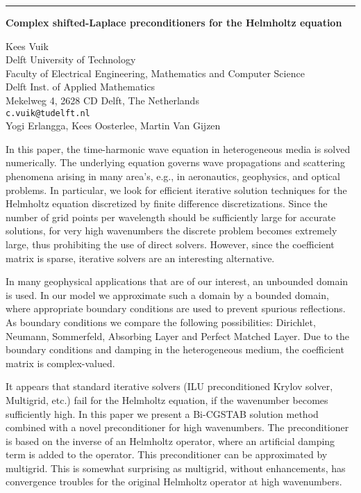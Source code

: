 \documentclass[twosided]{report}
\begin{document}
	\begin{center} \rule{6in}{1pt} \end{center}

\begin{center}
{\large			%
{\bf Complex shifted-Laplace preconditioners for the Helmholtz equation}}

	Kees Vuik \\
	Delft University of Technology \\
	Faculty of Electrical Engineering, Mathematics and Computer Science \\
	Delft Inst. of Applied Mathematics \\
	Mekelweg 4, 2628 CD Delft, The Netherlands \\
	{\tt c.vuik@tudelft.nl} \\
	Yogi Erlangga, Kees Oosterlee, Martin Van Gijzen
\end{center}
In this paper, the time-harmonic
wave equation in heterogeneous media is solved numerically.
The underlying equation governs wave propagations and
scattering phenomena arising in many area's, e.g., in
aeronautics, geophysics, and optical problems. In
particular, we look for efficient iterative solution
techniques for the Helmholtz equation discretized by finite
difference discretizations. Since the number of grid points
per wavelength should be sufficiently large for accurate
solutions, for very high wavenumbers the discrete problem
becomes extremely large, thus prohibiting the use of direct
solvers. However, since the coefficient matrix is sparse,
iterative solvers are an interesting alternative.

In many
geophysical applications that are of our interest, an
unbounded domain is used. In our model we approximate such a
domain by a bounded domain, where appropriate boundary
conditions are used to prevent spurious reflections. As
boundary conditions we compare the following possibilities:
Dirichlet, Neumann, Sommerfeld, Absorbing Layer and Perfect
Matched Layer. Due to the boundary conditions and damping in
the heterogeneous medium, the coefficient matrix is
complex-valued.

It appears that standard iterative
solvers (ILU preconditioned Krylov solver, Multigrid, etc.)
fail for the Helmholtz equation, if the wavenumber becomes
sufficiently high. In this paper we present a Bi-CGSTAB
solution method combined with a novel preconditioner for
high wavenumbers. The preconditioner is based on the inverse
of an Helmholtz operator, where an artificial damping term
is added to the operator. This preconditioner can be
approximated by multigrid. This is somewhat surprising as
multigrid, without enhancements, has convergence troubles
for the original Helmholtz operator at high wavenumbers.
\end{document}

